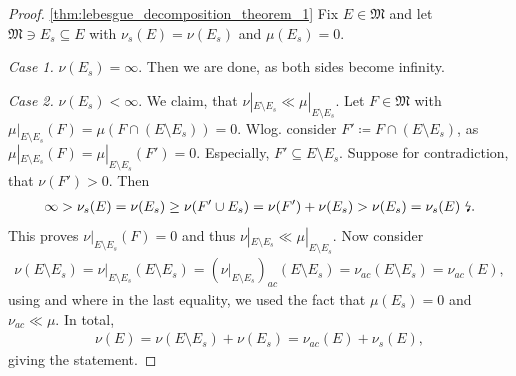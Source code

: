 \documentclass[10pt, leqno]{amsart}
\theoremstyle{definition}
\theoremstyle{remark}
\begin{document}
    \begin{proof}
        \ref{thm:lebesgue_decomposition_theorem_1} Fix \(E \in \mathfrak{M}\) and let \(\mathfrak{M} \ni E_s \subseteq E\) with \(\nu_s(E) = \nu(E_s)\) and \(\mu(E_s) = 0\).

        \phantom{}

        \emph{Case 1.} \(\nu(E_s) = \infty\). Then we are done, as both sides become infinity.

        \phantom{}

        \emph{Case 2.} \(\nu(E_s) < \infty\). We claim, that \(\nu|_{E \setminus E_s} \ll \mu|_{E \setminus E_s}\). Let \(F \in \mathfrak{M}\) with \(\mu|_{E \setminus E_s}(F) = \mu(F \cap (E \setminus E_s)) = 0\). Wlog. consider \(F' \coloneqq F \cap (E \setminus E_s)\), as \(\mu|_{E \setminus E_s}(F) = \mu|_{E \setminus E_s}(F') = 0\). Especially, \(F' \subseteq E \setminus E_s\). Suppose for contradiction, that \(\nu(F') > 0\). Then
        \begin{align}
            \infty > \nu_s(E) = \nu(E_s) \geq \nu(F' \cup E_s) = \nu(F') + \nu(E_s) > \nu(E_s) = \nu_s(E) \text{ \lightning.}
        \end{align}
        This proves \(\nu|_{E \setminus E_s}(F) = 0\) and thus \(\nu|_{E \setminus E_s} \ll \mu|_{E \setminus E_s}\). Now consider
        \begin{align}
            \nu(E \setminus E_s) = \nu|_{E \setminus E_s}(E \setminus E_s) = (\nu|_{E \setminus E_s})_{ac}(E \setminus E_s) = \nu_{ac}(E \setminus E_s) = \nu_{ac}(E),
        \end{align}
        using  and where in the last equality, we used the fact that \(\mu(E_s) = 0\) and \(\nu_{ac} \ll \mu\). In total,
        \begin{align}
            \nu(E) = \nu(E \setminus E_s) + \nu(E_s) = \nu_{ac}(E) + \nu_s(E),
        \end{align}
        giving the statement.


\end{proof}
\end{document}
